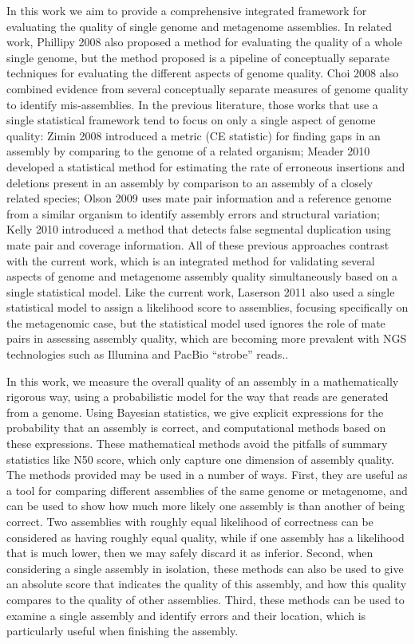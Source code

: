 \documentclass[phd,tocprelim]{cornell}
\begin{document}
In this work we aim to provide a comprehensive integrated framework for evaluating the quality of single genome and metagenome assemblies.  In related work, {Phillipy 2008} also proposed a method for evaluating the quality of a whole single genome, but the method proposed is a pipeline of conceptually separate techniques for evaluating the different aspects of genome quality.  {Choi 2008} also combined evidence from several conceptually separate measures of genome quality to identify mis-assemblies.  In the previous literature, those works that use a single statistical framework tend to focus on only a single aspect of genome quality: {Zimin 2008} introduced a metric (CE statistic) for finding gaps in an assembly by comparing to the genome of a related organism; {Meader 2010} developed a statistical method for estimating the rate of erroneous insertions and deletions present in an assembly by comparison to an assembly of a closely related species; {Olson 2009} uses mate pair information and a reference genome from a similar organism to identify assembly errors and structural variation;  {Kelly 2010} introduced a method that detects false segmental duplication using mate pair and coverage information.  All of these previous approaches contrast with the current work, which is an integrated method for validating several aspects of genome and metagenome assembly quality simultaneously based on a single statistical model.  Like the current work, {Laserson 2011} also used a single statistical model to assign a likelihood score to assemblies, focusing specifically on the metagenomic case, but the statistical model used ignores the role of mate pairs in assessing assembly quality, which are becoming more prevalent with NGS technologies such as Illumina and PacBio “strobe” reads..

In this work, we measure the overall quality of an assembly in a mathematically rigorous way, using a probabilistic model for the way that reads are generated from a genome.  Using Bayesian statistics, we give explicit expressions for the probability that an assembly is correct, and computational methods based on these expressions.  These mathematical methods avoid the pitfalls of summary statistics like N50 score, which only capture one dimension of assembly quality.
The methods provided may be used in a number of ways.  First, they are useful as a tool for comparing different assemblies of the same genome or metagenome, and can be used to show how much more likely one assembly is than another of being correct.  Two assemblies with roughly equal likelihood of correctness can be considered as having roughly equal quality, while if one assembly has a likelihood that is much lower, then we may safely discard it as inferior.  Second, when considering a single assembly in isolation, these methods can also be used to give an absolute score that indicates the quality of this assembly, and how this quality compares to the quality of other assemblies.  Third, these methods can be used to examine a single assembly and identify errors and their location, which is particularly useful when finishing the assembly.
\end{document}
